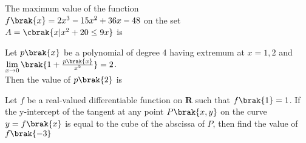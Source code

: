 \iffalse
\title{Assignment}
\author{Y.Harsha Vardhan Reddy}
\section{integer}
\fi
\item The maximum value of the function \\
$f\brak{x}=2x^3-15x^2+36x-48$ on the set\\
$A=\cbrak{x|x^2+20 \le 9x}$ is

\hfill {}

\item Let $p\brak{x}$ be a polynomial of degree 4 having extremum at $x=1,2 $ and $\lim \limits_{x\to 0} \brak{1+\frac{p\brak{x}}{x^2}} = 2$.\\
Then the value of $p\brak{2}$ is
\hfill {}
\item Let $f$ be a real-valued differentiable function on $\textbf{R}$ such that $f\brak{1}=1$. If the y-intercept of the tangent at any point $P\brak{x,y}$ on the curve $y=f\brak{x}$ is equal to the cube of the abscissa of $P$, then find the value of $f\brak{-3}$

    \hfill {}


